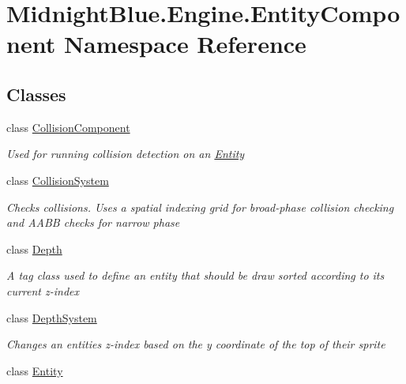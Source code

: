 \hypertarget{namespace_midnight_blue_1_1_engine_1_1_entity_component}{}\section{Midnight\+Blue.\+Engine.\+Entity\+Component Namespace Reference}
\label{namespace_midnight_blue_1_1_engine_1_1_entity_component}
\subsection*{Classes}
\begin{DoxyCompactItemize}
\item 
class \hyperlink{class_midnight_blue_1_1_engine_1_1_entity_component_1_1_collision_component}{Collision\+Component}
\begin{DoxyCompactList}\small\item\em Used for running collision detection on an \hyperlink{class_midnight_blue_1_1_engine_1_1_entity_component_1_1_entity}{Entity} \end{DoxyCompactList}\item 
class \hyperlink{class_midnight_blue_1_1_engine_1_1_entity_component_1_1_collision_system}{Collision\+System}
\begin{DoxyCompactList}\small\item\em Checks collisions. Uses a spatial indexing grid for broad-\/phase collision checking and A\+A\+BB checks for narrow phase \end{DoxyCompactList}\item 
class \hyperlink{class_midnight_blue_1_1_engine_1_1_entity_component_1_1_depth}{Depth}
\begin{DoxyCompactList}\small\item\em A tag class used to define an entity that should be draw sorted according to its current z-\/index \end{DoxyCompactList}\item 
class \hyperlink{class_midnight_blue_1_1_engine_1_1_entity_component_1_1_depth_system}{Depth\+System}
\begin{DoxyCompactList}\small\item\em Changes an entities z-\/index based on the y coordinate of the top of their sprite \end{DoxyCompactList}\item 
class \hyperlink{class_midnight_blue_1_1_engine_1_1_entity_component_1_1_entity}{Entity}

\end{DoxyCompactItemize}
